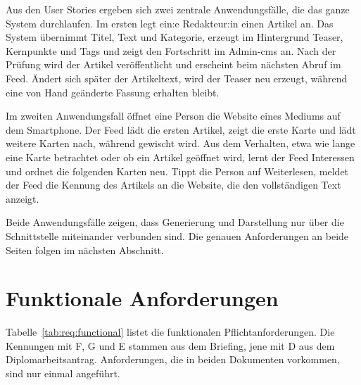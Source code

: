 Aus den User Stories ergeben sich zwei zentrale Anwendungsfälle, die das ganze System durchlaufen.
Im ersten legt ein:e Redakteur:in einen Artikel an.
Das System übernimmt Titel, Text und Kategorie, erzeugt im Hintergrund Teaser, Kernpunkte und Tags und zeigt den Fortschritt im Admin-\gls{cms} an.
Nach der Prüfung wird der Artikel veröffentlicht und erscheint beim nächsten Abruf im Feed.
Ändert sich später der Artikeltext, wird der Teaser neu erzeugt, während eine von Hand geänderte Fassung erhalten bleibt.

Im zweiten Anwendungsfall öffnet eine Person die Website eines Mediums auf dem Smartphone.
Der Feed lädt die ersten Artikel, zeigt die erste Karte und lädt weitere Karten nach, während gewischt wird.
Aus dem Verhalten, etwa wie lange eine Karte betrachtet oder ob ein Artikel geöffnet wird, lernt der Feed Interessen und ordnet die folgenden Karten neu.
Tippt die Person auf \glqq Weiterlesen\grqq{}, meldet der Feed die Kennung des Artikels an die Website, die den vollständigen Text anzeigt.

Beide Anwendungsfälle zeigen, dass Generierung und Darstellung nur über die Schnittstelle miteinander verbunden sind.
Die genauen Anforderungen an beide Seiten folgen im nächsten Abschnitt.

\section{Funktionale Anforderungen}\label{sec:req:functional}
\setauthor{\firstauthor}

Tabelle~\ref{tab:req:functional} listet die funktionalen Pflichtanforderungen.
Die Kennungen mit F, G und E stammen aus dem Briefing, jene mit D aus dem Diplomarbeitsantrag.
Anforderungen, die in beiden Dokumenten vorkommen, sind nur einmal angeführt.

